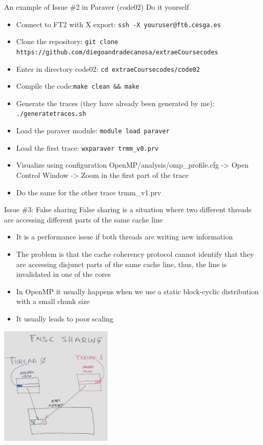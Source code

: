 \documentclass[10pt,xcolor=table]{beamer}
\begin{document}
\begin{frame}{An example of Issue \#2 in Paraver (code02)}
Do it yourself
\begin{itemize}
    \item Connect to FT2 with X export: {\tt ssh -X youruser@ft6.cesga.es}
    \item Clone the repository: {\tt git clone https://github.com/diegoandradecanosa/extraeCoursecodes}
    \item Enter in directory code02: {\tt cd extraeCoursecodes/code02}
        \item Compile the code:{\tt make clean && make}

    \item Generate the traces (they have already been generated by me): {\tt ./generatetraces.sh}
    \item Load the paraver module:  {\tt module load paraver}
    \item Load the first trace: {\tt wxparaver trmm\_v0.prv}
    \item Visualize using configuration OpenMP/analysis/omp\_profile.cfg -> Open Control Window -> Zoom in the first part of the trace
    \item Do the same for the other trace trmm\_v1.prv
\end{itemize}
\end{frame}


\begin{frame}{Issue \#3: False sharing}
False sharing is a situation where two different threads are accessing different  parts of the same cache line
\begin{itemize}
    \footnotesize
    \item It is a performance issue if both threads are writing new information
    \item The problem is that the cache coherency protocol cannot identify that they are accessing disjunct parts of the same cache line, thus, the line is invalidated in one of the cores
    \item In OpenMP it usually happens when we use a static block-cyclic distribution with a small chunk size
    \item It usually leads to poor scaling
\end{itemize}
\centering
\includegraphics[width=0.4\textwidth]{figs/myfalsesharing.jpg}
\end{frame}
\end{document}
